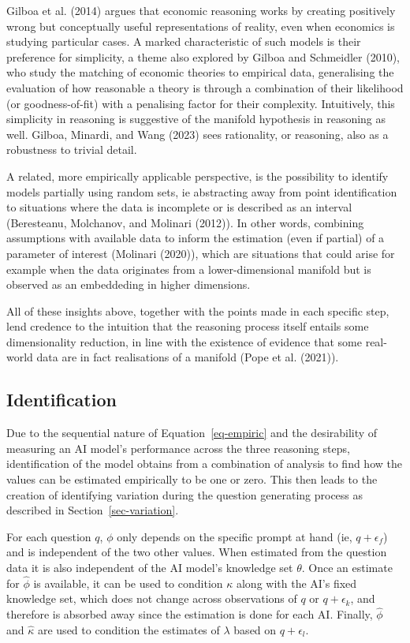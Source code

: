 \documentclass[
]{article}
\begin{document}
Gilboa et al. (2014) argues that economic reasoning works by creating
positively wrong but conceptually useful representations of reality,
even when economics is studying particular cases. A marked
characteristic of such models is their preference for simplicity, a
theme also explored by Gilboa and Schmeidler (2010), who study the
matching of economic theories to empirical data, generalising the
evaluation of how reasonable a theory is through a combination of their
likelihood (or goodness-of-fit) with a penalising factor for their
complexity. Intuitively, this simplicity in reasoning is suggestive of
the manifold hypothesis in reasoning as well. Gilboa, Minardi, and Wang
(2023) sees rationality, or reasoning, also as a robustness to trivial
detail.

A related, more empirically applicable perspective, is the possibility
to identify models partially using random sets, ie abstracting away from
point identification to situations where the data is incomplete or is
described as an interval (Beresteanu, Molchanov, and Molinari (2012)).
In other words, combining assumptions with available data to inform the
estimation (even if partial) of a parameter of interest (Molinari
(2020)), which are situations that could arise for example when the data
originates from a lower-dimensional manifold but is observed as an
embeddeding in higher dimensions.

All of these insights above, together with the points made in each
specific step, lend credence to the intuition that the reasoning process
itself entails some dimensionality reduction, in line with the existence
of evidence that some real-world data are in fact realisations of a
manifold (Pope et al. (2021)).

\subsection{Identification}\label{identification}

Due to the sequential nature of Equation~\ref{eq-empiric} and the
desirability of measuring an AI model's performance across the three
reasoning steps, identification of the model obtains from a combination
of analysis to find how the values can be estimated empirically to be
one or zero. This then leads to the creation of identifying variation
during the question generating process as described in
Section~\ref{sec-variation}.

For each question \(q\), \(\phi\) only depends on the specific prompt at
hand (ie, \(q + \epsilon_f\)) and is independent of the two other
values. When estimated from the question data it is also independent of
the AI model's knowledge set \(\theta\). Once an estimate for
\(\hat{\phi}\) is available, it can be used to condition \(\kappa\)
along with the AI's fixed knowledge set, which does not change across
observations of \(q\) or \(q + \epsilon_k\), and therefore is absorbed
away since the estimation is done for each AI. Finally, \(\hat{\phi}\)
and \(\hat{\kappa}\) are used to condition the estimates of \(\lambda\)
based on \(q + \epsilon_l\).
\end{document}
